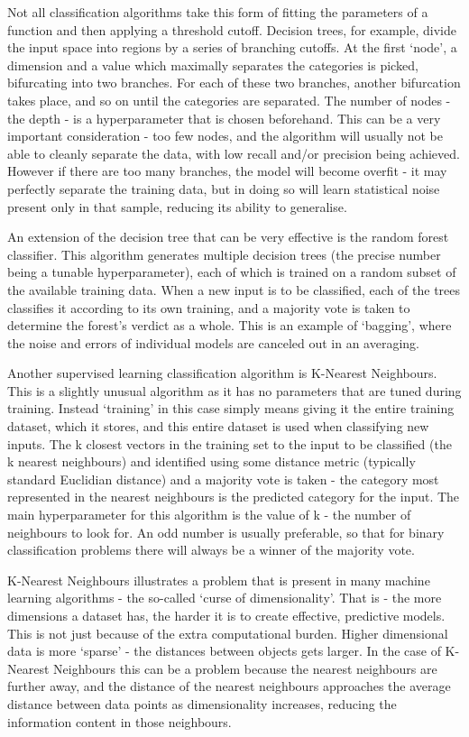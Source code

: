 Not all classification algorithms take this form of fitting the parameters of a function and then applying a threshold cutoff. Decision trees, for example, divide the input space into regions by a series of branching cutoffs. At the first `node', a dimension and a value which maximally separates the categories is picked, bifurcating into two branches. For each of these two branches, another bifurcation takes place, and so on until the categories are separated. The number of nodes - the depth - is a hyperparameter that is chosen beforehand. This can be a very important consideration - too few nodes, and the algorithm will usually not be able to cleanly separate the data, with low recall and/or precision being achieved. However if there are too many branches, the model will become overfit - it may perfectly separate the training data, but in doing so will learn statistical noise present only in that sample, reducing its ability to generalise.

An extension of the decision tree that can be very effective is the random forest classifier. This algorithm generates multiple decision trees (the precise number being a tunable hyperparameter), each of which is trained on a random subset of the available training data. When a new input is to be classified, each of the trees classifies it according to its own training, and a majority vote is taken to determine the forest's verdict as a whole. This is an example of `bagging', where the noise and errors of individual models are canceled out in an averaging. 

Another supervised learning classification algorithm is K-Nearest Neighbours. This is a slightly unusual algorithm as it has no parameters that are tuned during training. Instead `training' in this case simply means giving it the entire training dataset, which it stores, and this entire dataset is used when classifying new inputs. The k closest vectors in the training set to the input to be classified (the k nearest neighbours) and identified using some distance metric (typically standard Euclidian distance) and a majority vote is taken - the category most represented in the nearest neighbours is the predicted category for the input. The main hyperparameter for this algorithm is the value of k - the number of neighbours to look for. An odd number is usually preferable, so that for binary classification problems there will always be a winner of the majority vote.

K-Nearest Neighbours illustrates a problem that is present in many machine learning algorithms - the so-called `curse of dimensionality'. That is - the more dimensions a dataset has, the harder it is to create effective, predictive models. This is not just because of the extra computational burden. Higher dimensional data is more `sparse' - the distances between objects gets larger. In the case of K-Nearest Neighbours this can be a problem because the nearest neighbours are further away, and the distance of the nearest neighbours approaches the average distance between data points as dimensionality increases, reducing the information content in those neighbours.

